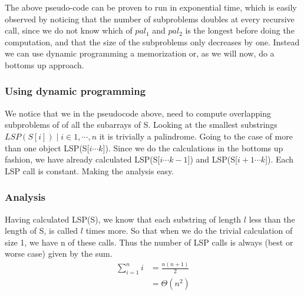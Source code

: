 \documentclass[11pt,english]{article}
\begin{document}
\noindent
The above pseudo-code can be proven to run in exponential time, which is
easily observed by noticing that the number of subproblems doubles at every
recursive call, since we do not know which of $pal_1$ and $pal_2$ is the
longest before doing the computation, and that the size of the subproblems
only decreases by one. Instead we can use dynamic programming a memorization
or, as we will now, do a bottoms up approach.

\subsubsection*{Using dynamic programming}
We notice that we in the pseudocode above, need to compute overlapping
subproblems of of all the subarrays of S. Looking at the smallest substrings
$LSP(S[i]) \mid i \in {1,\cdots, n}$ it is trivially a palindrome. Going to
the case of more than one object LSP(S[$i \cdots k$]). Since we do the
calculations in the bottoms up fashion, we have already calculated
LSP(S[$i \cdots k-1$]) and LSP(S[$i+1 \cdots k$]). Each LSP call is constant.
Making the analysis easy.

\subsubsection*{Analysis}
Having calculated LSP(S), we know that each substring of length $l$ less than
the length of S, is called $l$ times more. So that when we do the trivial
calculation of size 1, we have n of these calls. Thus the number of LSP calls
is always (best or worse case) given by the sum.
\begin{align*}
\sum_{i = 1}^n i &= \frac{n(n+1)}{2} \\
&= \Theta(n^2)
\end{align*}







\end{document}
